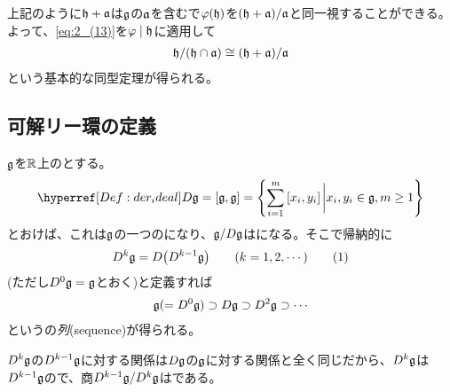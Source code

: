 \documentclass[fleqn,twocolumn,titlepage,dvipdfmx]{jsarticle}
\begin{document}
\begin{remark}
  上記のように$\mathfrak{h}+\mathfrak{a}$は$\mathfrak{g}$の$\mathfrak{a}$を含む{}で$\varphi(\mathfrak{h})$を$(\mathfrak{h}+\mathfrak{a})/\mathfrak{a}$と同一視することができる。よって、\eqref{eq:2_(13)}を$\varphi\mid\mathfrak{h}$に適用して
  \begin{align*}
    \mathfrak{h}/(\mathfrak{h}\cap\mathfrak{a})\cong(\mathfrak{h}+\mathfrak{a})/\mathfrak{a}
  \end{align*}
  という基本的な同型定理が得られる。
\end{remark}






\clearpage
{}
\subsection{可解リー環の定義}
\begin{definition}[列]\label{Def:sequence}
  $\mathfrak{g}$を{}$\mathbb{R}$上の{}とする。
  \begin{align*}
    \href{Def:der_ideal}{D\g}=\comm{\g}{\g}=\qty{\sum_{i=1}^{m}\comm{x_{i}}{y_{i}}\eval x_{i},y_{i}\in\g, m\ge1}
  \end{align*}
  とおけば、これは$\mathfrak{g}$の一つの{}になり、{}$\mathfrak{g}/D\mathfrak{g}$は{}になる。そこで帰納的に
  \begin{align*}
    D^{k}\g=D\qty(D^{k-1}\g)\qq{}(k=1,2,\cdots)
    \tag{1}\label{eq:3_(1)}
  \end{align*}
  (ただし$D^{0}\mathfrak{g}=\mathfrak{g}$とおく)と定義すれば
  \begin{align*}
    \mathfrak{g}(=D^{0}\mathfrak{g})\supset D\mathfrak{g} \supset D^{2}\mathfrak{g} \supset \cdots
  \end{align*}
  という{}の\emph{列}(sequence)が得られる。
\end{definition}

\begin{remark}
  $D^{k}\mathfrak{g}$の$D^{k-1}\mathfrak{g}$に対する関係は$D\mathfrak{g}$の$\mathfrak{g}$に対する関係と全く同じだから、$D^{k}\mathfrak{g}$は$D^{k-1}\mathfrak{g}$の{}で、商$D^{k-1}\mathfrak{g}/D^{k}\mathfrak{g}$は{}である。
\end{remark}
\end{document}
